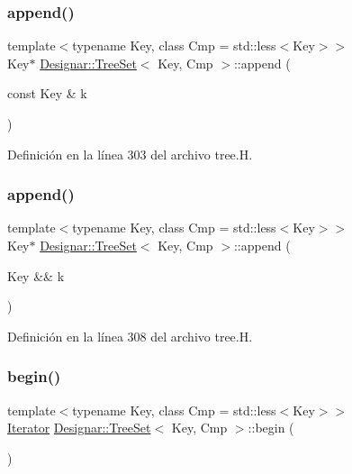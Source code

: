 \subsubsection{\texorpdfstring{append()}{append()}\hspace{0.1cm}{\footnotesize\ttfamily [1/2]}}
{\footnotesize\ttfamily template$<$typename Key, class Cmp = std\+::less$<$\+Key$>$$>$ \\
Key$\ast$ \hyperlink{class_designar_1_1_tree_set}{Designar\+::\+Tree\+Set}$<$ Key, Cmp $>$\+::append (\begin{DoxyParamCaption}\item[{const Key \&}]{k }\end{DoxyParamCaption})\hspace{0.3cm}{\ttfamily [inline]}}



Definición en la línea 303 del archivo tree.\+H.

\mbox{\label{class_designar_1_1_tree_set_a25bb5eea05f2ab11a2c988686fc3a42c}} 
\subsubsection{\texorpdfstring{append()}{append()}\hspace{0.1cm}{\footnotesize\ttfamily [2/2]}}
{\footnotesize\ttfamily template$<$typename Key, class Cmp = std\+::less$<$\+Key$>$$>$ \\
Key$\ast$ \hyperlink{class_designar_1_1_tree_set}{Designar\+::\+Tree\+Set}$<$ Key, Cmp $>$\+::append (\begin{DoxyParamCaption}\item[{Key \&\&}]{k }\end{DoxyParamCaption})\hspace{0.3cm}{\ttfamily [inline]}}



Definición en la línea 308 del archivo tree.\+H.

\mbox{\label{class_designar_1_1_tree_set_a2b51174c1290413611f407d54a3e5104}} 
\subsubsection{\texorpdfstring{begin()}{begin()}\hspace{0.1cm}{\footnotesize\ttfamily [1/2]}}
{\footnotesize\ttfamily template$<$typename Key, class Cmp = std\+::less$<$\+Key$>$$>$ \\
\hyperlink{class_designar_1_1_tree_set_1_1_iterator}{Iterator} \hyperlink{class_designar_1_1_tree_set}{Designar\+::\+Tree\+Set}$<$ Key, Cmp $>$\+::begin (\begin{DoxyParamCaption}{ }\end{DoxyParamCaption})\hspace{0.3cm}{\ttfamily [inline]}}



